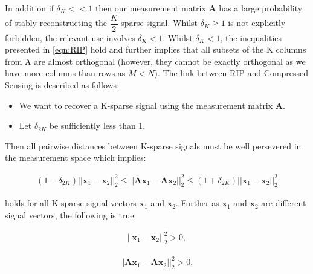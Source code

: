 \documentclass[titlepage,oneside, 12pt]{book}
\theoremstyle{break}
\begin{document}
In addition if $\delta_{K} << 1$ then our measurement matrix \textbf{A} has a large probability of stably reconstructing the $\dfrac{K}{2}$-sparse signal. Whilst $\delta_{K} \geq 1$ is not explicitly forbidden, the relevant use involves $\delta_{K} < 1$. 
Whilst $\delta_{K} < 1$, the inequalities presented in \eqref{eqn:RIP} hold and further implies that all subsets of the K columns from A are almost orthogonal (however, they cannot be exactly orthogonal as we have more columns than rows as $M < N$). 
\newpage
The link between RIP and Compressed Sensing is described as follows: 



\begin{itemize}
\item We want to recover a K-sparse signal using the measurement matrix $\textbf{A}$. 
\item Let $\delta_{2K}$ be sufficiently less than 1.
\end{itemize}


Then all pairwise distances between K-sparse signals must be well persevered in the measurement space which implies: 

\begin{equation}
\begin{gathered}
(1 - \delta_{2K})||\textbf{x}_{1} - \textbf{x}_{2}||_{2}^2 \leq ||\textbf{Ax}_{1} - \textbf{Ax}_{2}||_{2}^{2} \leq (1 + \delta_{2K})||\textbf{x}_{1} - \textbf{x}_{2}||_{2}^{2}
\end{gathered}
\label{eqn:RIP2}
\end{equation}

holds for all K-sparse signal vectors $ \textbf{x}_{1} $ and $ \textbf{x}_{2} $. Further as $ \textbf{x}_{1} $ and $ \textbf{x}_{2} $ are different signal vectors, the following is true: 

\begin{equation}
\begin{gathered}
||\textbf{x}_{1} - \textbf{x}_{2}||_{2}^2 > 0,
\end{gathered}
\label{eqn:fact1}
\end{equation}

\begin{equation}
\begin{gathered}
||\textbf{Ax}_{1} - \textbf{Ax}_{2}||_{2}^2 > 0,
\end{gathered}
\label{eqn:fact2}
\end{equation}
\end{document}
